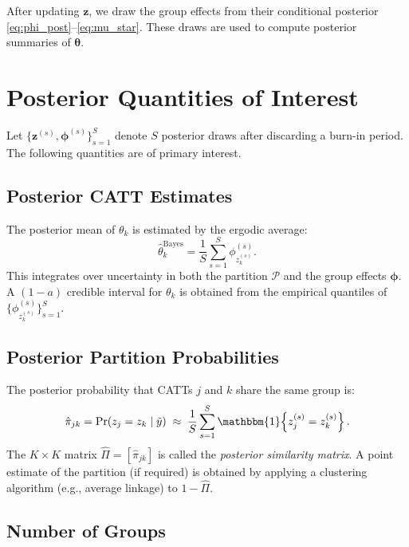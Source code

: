 \documentclass[12pt]{article}
\newcommand{\1}{\mathbbm{1}}
\newcommand{\ytd}{\tilde{y}}
\begin{document}
After updating $\bm{z}$, we draw the group effects from their conditional
posterior \eqref{eq:phi_post}--\eqref{eq:mu_star}. These draws are used to
compute posterior summaries of $\bm{\theta}$.

\section{Posterior Quantities of Interest}

Let $\{\bm{z}^{(s)}, \bm{\phi}^{(s)}\}_{s=1}^{S}$ denote $S$ posterior draws
after discarding a burn-in period. The following quantities are of primary
interest.

\subsection{Posterior CATT Estimates}

The posterior mean of $\theta_k$ is estimated by the ergodic average:
\begin{equation}
  \hat{\theta}_k^{\mathrm{Bayes}} = \frac{1}{S}\sum_{s=1}^{S}\phi_{z_k^{(s)}}^{(s)}.
  \label{eq:post_mean}
\end{equation}
This integrates over uncertainty in both the partition $\mathcal{P}$ and the
group effects $\bm{\phi}$. A $(1-a)$ credible interval for $\theta_k$ is
obtained from the empirical quantiles of $\{\phi_{z_k^{(s)}}^{(s)}\}_{s=1}^{S}$.

\subsection{Posterior Partition Probabilities}

The posterior probability that CATTs $j$ and $k$ share the same group is:
\begin{equation}
  \hat{\pi}_{jk} = \Pr(z_j = z_k\mid\ytd) \;\approx\;
    \frac{1}{S}\sum_{s=1}^{S}\1\!\left\{z_j^{(s)} = z_k^{(s)}\right\}.
  \label{eq:pairwise}
\end{equation}
The $K\times K$ matrix $\hat{\Pi} = [\hat{\pi}_{jk}]$ is called the
\emph{posterior similarity matrix}. A point estimate of the partition (if
required) is obtained by applying a clustering algorithm (e.g., average
linkage) to $1 - \hat{\Pi}$.

\subsection{Number of Groups}
\end{document}
